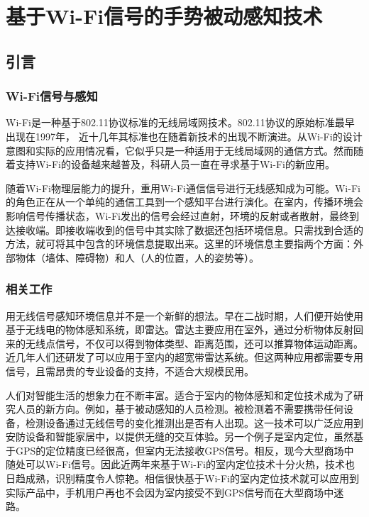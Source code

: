 \chapter {基于Wi-Fi信号的手势被动感知技术}

 \section{引言}

\subsection{Wi-Fi信号与感知}

Wi-Fi是一种基于802.11协议标准的无线局域网技术。802.11协议的原始标准最早出现在1997年， 近十几年其标准也在随着新技术的出现不断演进。从Wi-Fi的设计意图和实际的应用情况看，它似乎只是一种适用于无线局域网的通信方式。然而随着支持Wi-Fi的设备越来越普及，科研人员一直在寻求基于Wi-Fi的新应用。

随着Wi-Fi物理层能力的提升，重用Wi-Fi通信信号进行无线感知成为可能。Wi-Fi的角色正在从一个单纯的通信工具到一个感知平台进行演化。在室内，传播环境会影响信号传播状态，Wi-Fi发出的信号会经过直射，环境的反射或者散射，最终到达接收端。即接收端收到的信号中其实除了数据还包括环境信息。只需找到合适的方法，就可将其中包含的环境信息提取出来。这里的环境信息主要指两个方面：外部物体（墙体、障碍物）和人（人的位置，人的姿势等）。

\subsection{相关工作}
用无线信号感知环境信息并不是一个新鲜的想法。早在二战时期，人们便开始使用基于无线电的物体感知系统，即雷达。雷达主要应用在室外，通过分析物体反射回来的无线点信号，不仅可以得到物体类型、距离范围，还可以推算物体运动距离。近几年人们还研发了可以应用于室内的超宽带雷达系统。但这两种应用都需要专用信号，且需昂贵的专业设备的支持，不适合大规模民用。

人们对智能生活的想象力在不断丰富。适合于室内的物体感知和定位技术成为了研究人员的新方向。例如，基于被动感知的人员检测。被检测着不需要携带任何设备，检测设备通过无线信号的变化推测出是否有人出现。这一技术可以广泛应用到安防设备和智能家居中，以提供无缝的交互体验。另一个例子是室内定位，虽然基于GPS的定位精度已经很高，但室内无法接收GPS信号。相反，现今大型商场中随处可以Wi-Fi信号。因此近两年来基于Wi-Fi的室内定位技术十分火热，技术也日趋成熟，识别精度令人惊艳。相信很快基于Wi-Fi的室内定位技术就可以应用到实际产品中，手机用户再也不会因为室内接受不到GPS信号而在大型商场中迷路。

